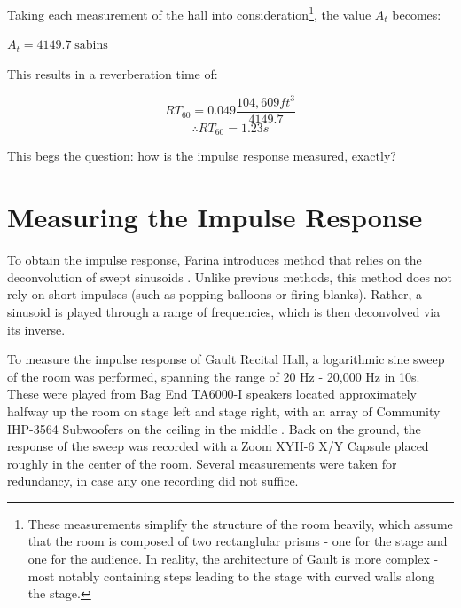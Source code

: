 Taking each measurement of the hall into consideration\footnote{These measurements simplify the structure of the room heavily, which assume that the room is composed of two rectanglular prisms - one for the stage and one for the audience. In reality, the architecture of Gault is more complex - most notably containing steps leading to the stage with curved walls along the stage.}, the value $A_t$ becomes:
\begin{center}
\end{center}
\begin{center}
  $A_t = 4149.7 \; \text{sabins}$
\end{center}

This results in a reverberation time of:

\begin{equation}
 RT_{60} = 0.049 \frac{104,609 ft^3}{4149.7}
\end{equation}
\begin{equation}
 \therefore RT_{60} = 1.23s
\end{equation}

This begs the question: how is the impulse response measured, exactly?

\section{Measuring the Impulse Response}
To obtain the impulse response, Farina introduces method that relies on the deconvolution of swept sinusoids \cite{farina2000simultaneous}. Unlike previous methods, this method does not rely on short impulses (such as popping balloons or firing blanks). Rather, a sinusoid is played through a range of frequencies, which is then deconvolved via its inverse.

To measure the impulse response of Gault Recital Hall, a logarithmic sine sweep of the room was performed, spanning the range of 20 Hz - 20,000 Hz in 10s. These were played from Bag End TA6000-I speakers located approximately halfway up the room on stage left and stage right, with an array of Community IHP-3564 Subwoofers on the ceiling in the middle \cite{woosound}. Back on the ground, the response of the sweep was recorded with a Zoom XYH-6 X/Y Capsule placed roughly in the center of the room. Several measurements were taken for redundancy, in case any one recording did not suffice.

